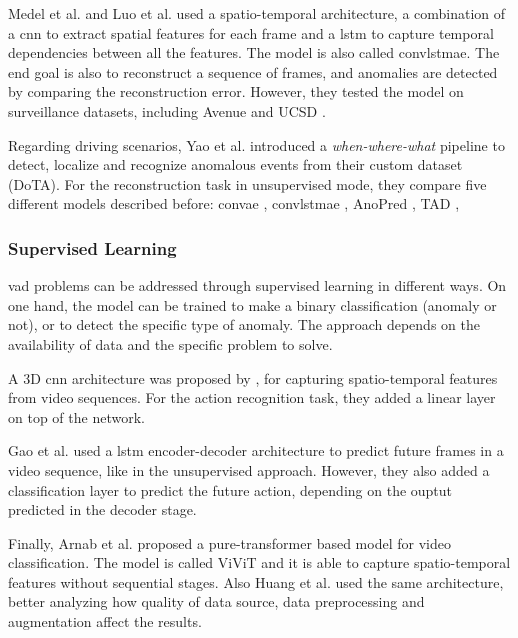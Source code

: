 Medel et al. \cite{medel_lstmconvae} and Luo et al. \cite{luo_lstmconvae}
 used a spatio-temporal architecture, a 
combination of a \ac{cnn} to extract spatial features for each frame and a 
\ac{lstm} to capture temporal dependencies between all the features. 
The model is also called \ac{convlstmae}.
The end 
goal is also to reconstruct a sequence of frames, and anomalies are detected 
by comparing the reconstruction error. However, they tested the model on 
surveillance datasets, including Avenue \cite{a3d} and UCSD \cite{ucsd}.

Regarding driving scenarios, Yao et al. \cite{dota_dataset} introduced a 
\emph{when-where-what} pipeline to detect, localize and recognize anomalous 
events from their custom dataset (DoTA). For the reconstruction task in 
unsupervised mode, they compare five different models described before: 
\ac{convae} \cite{hasan_convae}, \ac{convlstmae} \cite{luo_lstmconvae}, 
AnoPred \cite{shanghaitech_dataset}, TAD \cite{a3d}, 

\subsubsection*{Supervised Learning}
\ac{vad} problems can be addressed through supervised learning in different ways.
On one hand, the model can be trained to make a binary classification (anomaly 
or not), or to detect the specific type of anomaly. The approach depends on the 
availability of data and the specific problem to solve.

A 3D \ac{cnn} architecture was proposed by 
\cites{tran_3dconvnet}{carreira_3dconvnet}{diba_3dconvnet},
for capturing spatio-temporal
features from video sequences. For the action recognition task, they added a 
linear layer on top of the network.

Gao et al. \cite{gao_lstm_encoder} used a \ac{lstm} encoder-decoder architecture 
to predict future frames in a video sequence, like in the unsupervised 
approach. However, they also added a classification layer to predict the 
future action, depending on the ouptut predicted in the decoder stage.

Finally, Arnab et al. \cite{vivit} proposed a pure-transformer based model for 
video classification. The model is called ViViT and it is able to capture 
spatio-temporal features without sequential stages.
Also Huang et al. \cite{vivit} used the same architecture, better analyzing how 
quality of data source, data preprocessing and augmentation affect the results.

